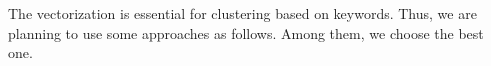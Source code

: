The vectorization is essential for clustering based on keywords. Thus, we are planning to use some approaches as follows. Among them, we choose the best one.